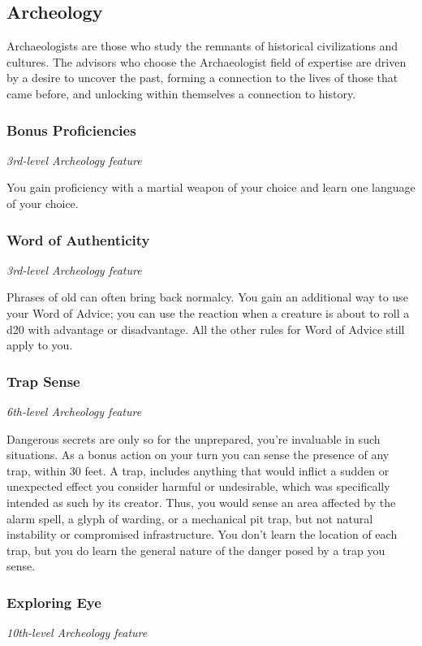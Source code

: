\documentclass[letterpaper,openany,twoside,twocolumn]{book}
\begin{document}
	\subsection*{Archeology}
	Archaeologists are those who study the remnants of historical civilizations and cultures. The advisors who choose the Archaeologist field of expertise are driven by a desire to uncover the past, forming a connection to the lives of those that came before, and unlocking within themselves a connection to history.
	
	\subsubsection*{Bonus Proficiencies}
	\textnormal{\textit{3rd-level Archeology feature}}
	
	You gain proficiency with a martial weapon of your choice and learn one language of your choice.
	
	\subsubsection*{Word of Authenticity}
	\textnormal{\textit{3rd-level Archeology feature}}
	
	Phrases of old can often bring back normalcy. You gain an additional way to use your Word of Advice; you can use the reaction when a creature is about to roll a d20 with advantage or disadvantage. All the other rules for Word of Advice still apply to you.
	
	\subsubsection*{Trap Sense}
	\textnormal{\textit{6th-level Archeology feature}}
	
	Dangerous secrets are only so for the unprepared, you're invaluable in such situations. As a bonus action on your turn you can sense the presence of any trap, within 30 feet. A trap, includes anything that would inflict a sudden or unexpected effect you consider harmful or undesirable, which was specifically intended as such by its creator. Thus, you would sense an area affected by the alarm spell, a glyph of warding, or a mechanical pit trap, but not natural instability or compromised infrastructure. You don't learn the location of each trap, but you do learn the general nature of the danger posed by a trap you sense.
	
	\subsubsection*{Exploring Eye}
	\textnormal{\textit{10th-level Archeology feature}}
	
\end{document}
